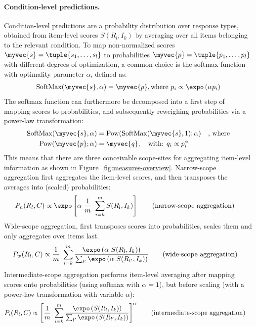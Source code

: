 \documentclass{article}
\begin{document}
\paragraph{Condition-level predictions.}
Condition-level predictions are a probability distribution over response types, obtained from item-level scores $S(R_{l}, I_{k})$ by averaging over all items belonging to the relevant condition.
To map non-normalized scores $\myvec{s} = \tuple{s_{1}, \dots, s_{l}}$ to probabilities $\myvec{p} = \tuple{p_{1}, \dots, p_{l}}$ with different degrees of optimization, a common choice is the softmax function with optimality parameter $\alpha$, defined as:
%
\begin{align*}
 \text{SoftMax}(\myvec{s}, \alpha) = \myvec{p}, \text{where } p_{i} \propto \expo \left (\alpha p_{i} \right )
\end{align*}
%
The softmax function can furthermore be decomposed into a first step of mapping scores to probabilities, and subsequently reweighing probabilities via a power-law transformation:
%
\begin{align*}
  \text{SoftMax}(\myvec{s}, \alpha) & = \text{Pow}( \text{SoftMax}(\myvec{s}, 1) ; \alpha) \ \ \  \text{, where} \\
  \text{Pow}(\myvec{p} ; \alpha) & = \myvec{q}, \ \ \ \text{with: } q_{i} \propto p_{i}^{\alpha}
\end{align*}
%
This means that there are three conceivable scope-sites for aggregating item-level information as shown in Figure~\ref{fig:measures-overview}.
Narrow-scope aggregation first aggregates the item-level scores, and then transposes the averages into (scaled) probabilities:
%
\begin{align*}
  & P_{n}(R_{l}, C) \propto \expo \left [  \alpha \ \frac{1}{m} \ \sum_{i = k}^{m} S(R_{l}, I_{k})  \right ]
    \tag*{(narrow-scope aggregation)}
\end{align*}
%
Wide-scope aggregation, first transposes scores into probabilities, scales them and only aggregates over items last.
\begin{align*}
  & P_{w}(R_{l}, C) \propto \frac{1}{m} \ \sum_{i = k}^{m} \frac{\expo \left( \alpha \ S(R_{l}, I_{k}) \right )}{ \sum_{l'} \expo \left( \alpha \ S(R_{l'}, I_{k}) \right )}
    \tag*{(wide-scope aggregation)}
\end{align*}
%
Intermediate-scope aggregation performs item-level averaging after mapping scores onto probabilities (using softmax with $\alpha=1$), but before scaling (with a power-law transformation with variable $\alpha$):
\begin{align*}
  & P_{i}(R_{l}, C) \propto  \left [ \frac{1}{m} \ \sum_{i = k}^{m} \frac{\expo \left( S(R_{l}, I_{k}) \right )}{ \sum_{l'} \expo \left( S(R_{l'}, I_{k}) \right )} \right ]^{\alpha}
    \tag*{(intermediate-scope aggregation)}
\end{align*}
\end{document}
